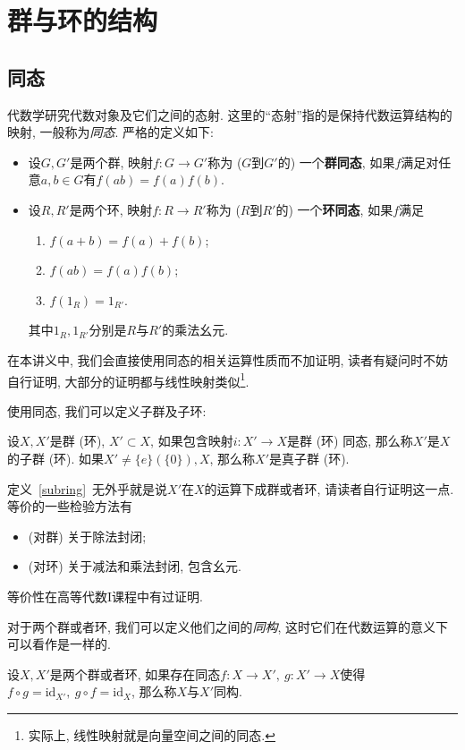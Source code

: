 \chapter{群与环的结构}\label{structures}
\section{同态}
代数学研究代数对象及它们之间的态射.
这里的``态射''指的是保持代数运算结构的映射, 一般称为\textit{同态}.
严格的定义如下:

\begin{defn}
    \begin{itemize}
        \item 设$G,G'$是两个群, 映射$f:G\to G'$称为 ($G$到$G'$的) 一个\textbf{群同态}, 如果$f$满足对任意$a,b\in G$有$f(ab)=f(a)f(b)$.
        \item 设$R,R'$是两个环, 映射$f:R\to R'$称为 ($R$到$R'$的) 一个\textbf{环同态}, 如果$f$满足
        \begin{enumerate}[(1)]
            \item $f(a+b)=f(a)+f(b)$;
            \item $f(ab)=f(a)f(b)$;
            \item $f(1_R)=1_{R'}$.
        \end{enumerate}
        其中$1_R,1_{R'}$分别是$R$与$R'$的乘法幺元.
    \end{itemize}
\end{defn}

在本讲义中, 我们会直接使用同态的相关运算性质而不加证明, 读者有疑问时不妨自行证明, 大部分的证明都与线性映射类似\footnote{实际上, 线性映射就是向量空间之间的同态.}.

使用同态, 我们可以定义子群及子环:

\begin{defn}\label{subring}
    设$X,X'$是群 (环), $X'\subset X$, 如果包含映射$i:X'\to X$是群 (环) 同态, 那么称$X'$是$X$的子群 (环).
    如果$X'\neq\{e\}(\{0\}),X$, 那么称$X'$是真子群 (环).
\end{defn}

定义~\ref{subring}~无外乎就是说$X'$在$X$的运算下成群或者环, 请读者自行证明这一点.
等价的一些检验方法有
\begin{itemize}
    \item (对群) 关于除法封闭;
    \item (对环) 关于减法和乘法封闭, 包含幺元.
\end{itemize}
等价性在高等代数I课程中有过证明.

对于两个群或者环, 我们可以定义他们之间的\textit{同构}, 这时它们在代数运算的意义下可以看作是一样的.
\begin{defn}
    设$X, X'$是两个群或者环, 如果存在同态$f:X\to X',\ g:X'\to X$使得$f\circ g=\mathrm{id}_{X'},\ g\circ f=\mathrm{id}_X$, 那么称$X$与$X'$同构.
\end{defn}

